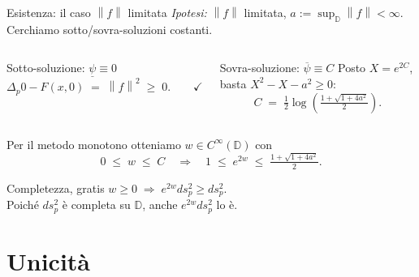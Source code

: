 \documentclass[aspectratio=169,11pt]{beamer}
\newcommand{\D}{\mathbb{D}}
\newcommand{\norm}[1]{\left\lVert #1 \right\rVert}
\begin{document}
\begin{frame}[t]{Esistenza: il caso $\norm{f}$ limitata}
  \emph{Ipotesi:} $\norm{f}$ \alert{limitata}, $a:=\sup_\D\norm{f}<\infty$.
  Cerchiamo sotto/sovra-soluzioni costanti.

  \vspace{2mm}
  \begin{columns}[T,onlytextwidth]
    \begin{block}{Sotto-soluzione: $\underline\psi\equiv 0$}
      \centering
      \[
        \Delta_p 0 - F(x,0) \;=\; \norm{f}^2 \;\ge\; 0.\qquad\checkmark
      \]
    \end{block}
    \begin{block}{Sovra-soluzione: $\overline\psi\equiv C$}
      \centering
      Posto $X=e^{2C}$, basta $X^2-X-a^2\ge 0$:
      \[
        C \;=\; \tfrac12\log\!\left(\tfrac{1+\sqrt{1+4a^2}}{2}\right).
      \]
    \end{block}
  \end{columns}

  \vspace{3mm}
  Per il metodo monotono otteniamo $w\in C^\infty(\D)$ con
  \[
    0 \;\le\; w \;\le\; C
    \quad\Longrightarrow\quad
    1 \;\le\; e^{2w} \;\le\; \tfrac{1+\sqrt{1+4a^2}}{2}.
  \]

  \vspace{1mm}
  \begin{alertblock}{Completezza, gratis}
    \centering
    $w \ge 0\;\Rightarrow\; e^{2w}ds_p^2 \ge ds_p^2$.\\
    Poiché $ds_p^2$ è completa su $\D$, anche $e^{2w}ds_p^2$ lo è.
  \end{alertblock}
\end{frame}


\section{Unicità}
\end{document}
